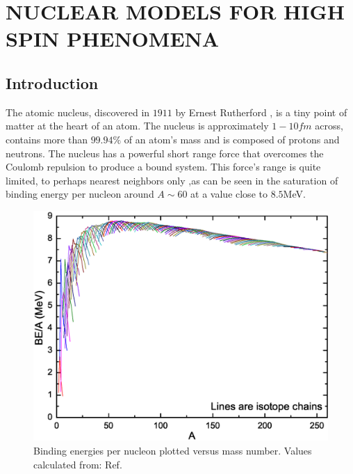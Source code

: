 %
%

\chapter{NUCLEAR MODELS FOR HIGH SPIN PHENOMENA}
\label{chp:models}

\section{Introduction}
\label{sec:models-into}
The atomic nucleus, discovered in $1911$ by Ernest Rutherford \cite{rutherfordNuclearModel}, is a tiny point of matter at the heart of an atom. The nucleus is approximately $1-10fm$ across, contains more than $99.94\%$ of an atom's mass and is composed of protons and neutrons. The nucleus has a powerful short range force that overcomes the Coulomb repulsion to produce a bound system. This force's range is quite limited, to perhaps nearest neighbors only ,as can be seen in the saturation of binding energy per nucleon around $A\sim60$ at a value close to $8.5$MeV.

\begin{figure}[h!]
\centerline{\includegraphics[width=\textwidth]{./img/c2/binding_plot.eps}}
	\caption{Binding energies per nucleon plotted versus mass number. Values calculated from: Ref.\cite{AME20031,AME20032}\label{fig:chp2-binding}}
\end{figure}

